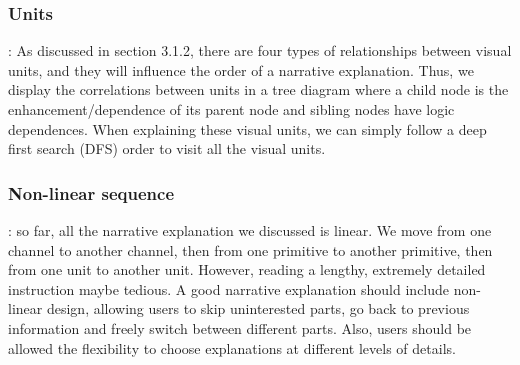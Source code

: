 \subsubsection{Units}: As discussed in section 3.1.2, there are four types of relationships between visual units, and they will influence the order of a narrative explanation. Thus, we display the correlations between units in a tree diagram where a child node is the enhancement/dependence of its parent node and sibling nodes have logic dependences. When explaining these visual units, we can simply follow a deep first search (DFS) order to visit all the visual units.\par
\subsubsection{Non-linear sequence}: so far, all the narrative explanation we discussed is linear. We move from one channel to another channel, then from one primitive to another primitive, then from one unit to another unit. However, reading a lengthy, extremely detailed instruction maybe tedious. A good narrative explanation should include non-linear design, allowing users to skip uninterested parts, go back to previous information and freely switch between different parts. Also, users should be allowed the flexibility to choose explanations at different levels of details. 
